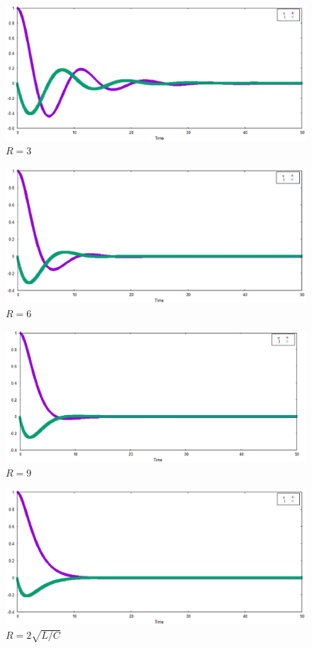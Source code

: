 \begin{figure}[htbp]
\centering
\includegraphics[scale=0.7]{./img/kadai7_R3.eps}
\caption{$R=3$}
\label{r3}
\end{figure}
\begin{figure}[htbp]
\centering
\includegraphics[scale=0.7]{./img/kadai7_R6.eps}
\caption{$R=6$}
\label{r6}
\end{figure}
\begin{figure}[htbp]
\centering
\includegraphics[scale=0.7]{./img/kadai7_R9.eps}
\caption{$R=9$}
\label{r9}
\end{figure}
\begin{figure}[htbp]
\centering
\includegraphics[scale=0.7]{./img/kadai7_sqr.eps}
\caption{$R=2\sqrt{L/C}$}
\label{rsqr}
\end{figure}

